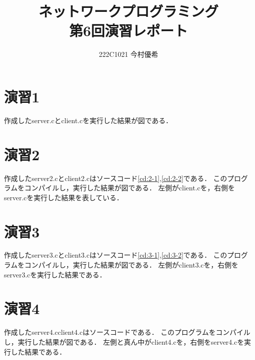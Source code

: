 \documentclass[documentclass]{jsarticle}
\begin{document}
\title{ネットワークプログラミング\\ 第6回演習レポート}
\author{222C1021 今村優希}
\maketitle

\newpage

\section*{演習1}
作成したserver.cとclient.cを実行した結果が図である．


\section*{演習2}
作成したserver2.cとclient2.cはソースコード\ref*{cd:2-1},\ref*{cd:2-2}である．
このプログラムをコンパイルし，実行した結果が図である．
左側がclient.cを，右側をserver.cを実行した結果を表している．





\section*{演習3}
作成したserver3.cとclient3.cはソースコード\ref*{cd:3-1},\ref*{cd:3-2}である．
このプログラムをコンパイルし，実行した結果が図である．
左側がclient3.cを，右側をserver3.cを実行した結果である．





\section*{演習4}
作成したserver4.cclient4.cはソースコードである．
このプログラムをコンパイルし，実行した結果が図である．
左側と真ん中がclient4.cを，右側をserver4.cを実行した結果である．



\end{document}
